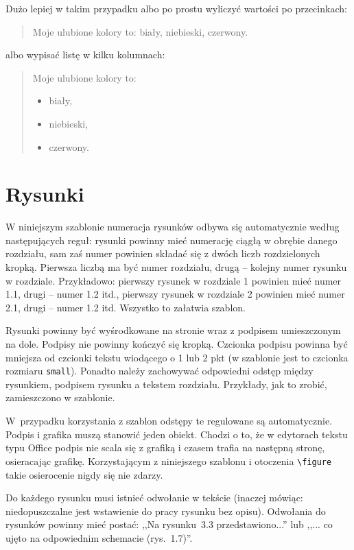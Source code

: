 Dużo lepiej w takim przypadku albo po prostu wyliczyć wartości po przecinkach:
\begin{quotation}
	\noindent Moje ulubione kolory to: biały, niebieski, czerwony.
\end{quotation}
albo wypisać listę w kilku kolumnach:
\begin{quotation}
	\noindent Moje ulubione kolory to:
\begin{multicols}{3}
	\begin{itemize}
	\item biały,
	\item niebieski,
	\item czerwony.
	\end{itemize}
\end{multicols}
\end{quotation}



\section{Rysunki}
W niniejszym szablonie numeracja rysunków odbywa się automatycznie według następujących reguł: rysunki powinny mieć numerację ciągłą w obrębie danego rozdziału, sam zaś numer powinien składać się z dwóch liczb rozdzielonych kropką. Pierwsza liczbą ma być numer rozdziału, drugą -- kolejny numer rysunku w rozdziale. Przykładowo: pierwszy rysunek w rozdziale 1 powinien mieć numer 1.1, drugi -- numer 1.2 itd., pierwszy rysunek w rozdziale 2 powinien mieć numer 2.1, drugi -- numer 1.2 itd. Wszystko to załatwia szablon. 

Rysunki powinny być wyśrodkowane na stronie wraz z podpisem umieszczonym na dole. Podpisy nie powinny kończyć się kropką. Czcionka podpisu powinna być mniejsza od czcionki tekstu wiodącego o 1 lub 2 pkt (w szablonie jest to czcionka rozmiaru \texttt{small}). Ponadto należy zachowywać odpowiedni odstęp między rysunkiem, podpisem rysunku a tekstem rozdziału. Przykłady, jak to zrobić, zamieszczono w szablonie.

W~przypadku korzystania z szablon odstępy te regulowane są automatycznie. Podpis i grafika muszą stanowić jeden obiekt. Chodzi o to, że w edytorach tekstu typu Office podpis nie scala się z grafiką i czasem trafia na następną stronę, osieracając grafikę. Korzystającym z niniejszego szablonu i otoczenia \verb?\figure? takie osierocenie nigdy się nie zdarzy.  

Do każdego rysunku musi istnieć odwołanie w tekście (inaczej mówiąc: niedopuszczalne jest wstawienie do pracy rysunku bez opisu). Odwołania do rysunków powinny mieć postać: ,,Na rysunku~3.3 przedstawiono...'' lub ,,... co ujęto na odpowiednim schemacie (rys.~1.7)''. 

